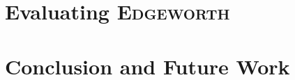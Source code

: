 \documentclass[12pt]{cmuthesis}
\newcommand*{\Edgeworth}{\textsc{Edgeworth}\xspace}
\begin{document}
\chapter{Evaluating \Edgeworth{}}
\label{chp:edgeworth-eval}


\chapter{Conclusion and Future Work}
\label{chp:conclusion}
% 



% 

\backmatter

\renewcommand{\baselinestretch}{1.0}\normalsize


\end{document}
